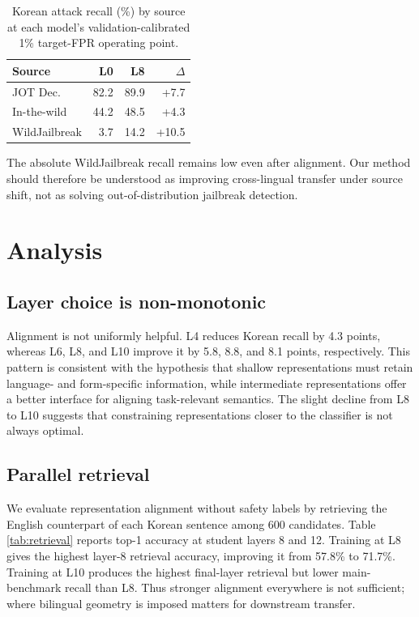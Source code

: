 \documentclass[10pt,twocolumn]{article}
\begin{document}
\begin{table}[t]
\centering
\small
\begin{tabular}{lrrr}
\toprule
Source & L0 & L8 & $\Delta$ \\
\midrule
JOT Dec. & 82.2 & 89.9 & +7.7 \\
In-the-wild & 44.2 & 48.5 & +4.3 \\
WildJailbreak & 3.7 & 14.2 & +10.5 \\
\bottomrule
\end{tabular}
\caption{Korean attack recall (\%) by source at each model's
validation-calibrated 1\% target-FPR operating point.}
\label{tab:source}
\end{table}

The absolute WildJailbreak recall remains low even after alignment. Our method
should therefore be understood as improving cross-lingual transfer under source
shift, not as solving out-of-distribution jailbreak detection.

\section{Analysis}

\subsection{Layer choice is non-monotonic}

Alignment is not uniformly helpful. L4 reduces Korean recall by 4.3 points,
whereas L6, L8, and L10 improve it by 5.8, 8.8, and 8.1 points, respectively.
This pattern is consistent with the hypothesis that shallow representations
must retain language- and form-specific information, while intermediate
representations offer a better interface for aligning task-relevant semantics.
The slight decline from L8 to L10 suggests that constraining representations
closer to the classifier is not always optimal.

\subsection{Parallel retrieval}

We evaluate representation alignment without safety labels by retrieving the
English counterpart of each Korean sentence among 600 candidates. Table
\ref{tab:retrieval} reports top-1 accuracy at student layers 8 and 12. Training
at L8 gives the highest layer-8 retrieval accuracy, improving it from 57.8\% to
71.7\%. Training at L10 produces the highest final-layer retrieval but lower
main-benchmark recall than L8. Thus stronger alignment everywhere is not
sufficient; where bilingual geometry is imposed matters for downstream
transfer.
\end{document}
